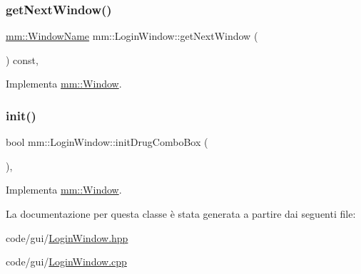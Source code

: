 \subsubsection{\texorpdfstring{get\+Next\+Window()}{getNextWindow()}}
{\footnotesize\ttfamily \hyperlink{namespacemm_a4e9d92e04f65dbf2fc1963947da0d93c}{mm\+::\+Window\+Name} mm\+::\+Login\+Window\+::get\+Next\+Window (\begin{DoxyParamCaption}{ }\end{DoxyParamCaption}) const\hspace{0.3cm}{\ttfamily [override]}, {\ttfamily [virtual]}}



Implementa \hyperlink{classmm_1_1_window_a0cd7b4b0feb9505c44503547a161fcd8}{mm\+::\+Window}.

\mbox{\label{classmm_1_1_login_window_a4040d7c1f85fc76e1f60ef13f92bef1c}} 
\subsubsection{\texorpdfstring{init()}{init()}}
{\footnotesize\ttfamily bool mm\+::\+Login\+Window\+::initDrugComboBox (\begin{DoxyParamCaption}{ }\end{DoxyParamCaption})\hspace{0.3cm}{\ttfamily [override]}, {\ttfamily [virtual]}}



Implementa \hyperlink{classmm_1_1_window_aba03fbf4761b2f106352baecf5996e10}{mm\+::\+Window}.



La documentazione per questa classe è stata generata a partire dai seguenti file\+:\begin{DoxyCompactItemize}
\item 
code/gui/\hyperlink{_login_window_8hpp}{Login\+Window.\+hpp}\item 
code/gui/\hyperlink{_login_window_8cpp}{Login\+Window.\+cpp}\end{DoxyCompactItemize}
